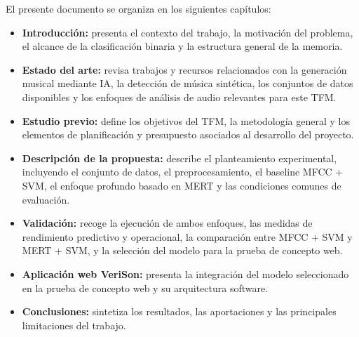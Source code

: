 El presente documento se organiza en los siguientes capítulos:
\begin{itemize}
    \item \textbf{Introducción:} presenta el contexto del trabajo, la motivación del problema, el alcance de la clasificación binaria y la estructura general de la memoria.
    \item \textbf{Estado del arte:} revisa trabajos y recursos relacionados con la generación musical mediante IA, la detección de música sintética, los conjuntos de datos disponibles y los enfoques de análisis de audio relevantes para este TFM.
    \item \textbf{Estudio previo:} define los objetivos del TFM, la metodología general y los elementos de planificación y presupuesto asociados al desarrollo del proyecto.
    \item \textbf{Descripción de la propuesta:} describe el planteamiento experimental, incluyendo el conjunto de datos, el preprocesamiento, el baseline MFCC + SVM, el enfoque profundo basado en MERT y las condiciones comunes de evaluación.
    \item \textbf{Validación:} recoge la ejecución de ambos enfoques, las medidas de rendimiento predictivo y operacional, la comparación entre MFCC + SVM y MERT + SVM, y la selección del modelo para la prueba de concepto web.
    \item \textbf{Aplicación web VeriSon:} presenta la integración del modelo seleccionado en la prueba de concepto web y su arquitectura software.
    \item \textbf{Conclusiones:} sintetiza los resultados, las aportaciones y las principales limitaciones del trabajo.
\end{itemize}
